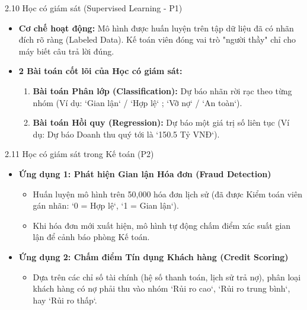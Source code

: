\documentclass[aspectratio=169]{beamer}
\begin{document}
\begin{frame}{2.10 Học có giám sát (Supervised Learning - P1)}
    \begin{itemize}
        \item \textbf{Cơ chế hoạt động:} Mô hình được huấn luyện trên tập dữ liệu đã có nhãn đích rõ ràng (Labeled Data). Kế toán viên đóng vai trò "người thầy" chỉ cho máy biết câu trả lời đúng.
        \item \textbf{2 Bài toán cốt lõi của Học có giám sát:}
        \begin{enumerate}
            \item \textbf{Bài toán Phân lớp (Classification):} Dự báo nhãn rời rạc theo từng nhóm (Ví dụ: `Gian lận` / `Hợp lệ` ; `Vỡ nợ` / `An toàn`).
            \item \textbf{Bài toán Hồi quy (Regression):} Dự báo một giá trị số liên tục (Ví dụ: Dự báo Doanh thu quý tới là `150.5 Tỷ VNĐ`).
        \end{enumerate}
    \end{itemize}
\end{frame}

\begin{frame}{2.11 Học có giám sát trong Kế toán (P2)}
    \begin{itemize}
        \item \textbf{Ứng dụng 1: Phát hiện Gian lận Hóa đơn (Fraud Detection)}
        \begin{itemize}
            \item Huấn luyện mô hình trên 50,000 hóa đơn lịch sử (đã được Kiểm toán viên gán nhãn: `0 = Hợp lệ`, `1 = Gian lận`).
            \item Khi hóa đơn mới xuất hiện, mô hình tự động chấm điểm xác suất gian lận để cảnh báo phòng Kế toán.
        \end{itemize}
        \item \textbf{Ứng dụng 2: Chấm điểm Tín dụng Khách hàng (Credit Scoring)}
        \begin{itemize}
            \item Dựa trên các chỉ số tài chính (hệ số thanh toán, lịch sử trả nợ), phân loại khách hàng có nợ phải thu vào nhóm `Rủi ro cao`, `Rủi ro trung bình`, hay `Rủi ro thấp`.
        \end{itemize}
    \end{itemize}
\end{frame}
\end{document}
